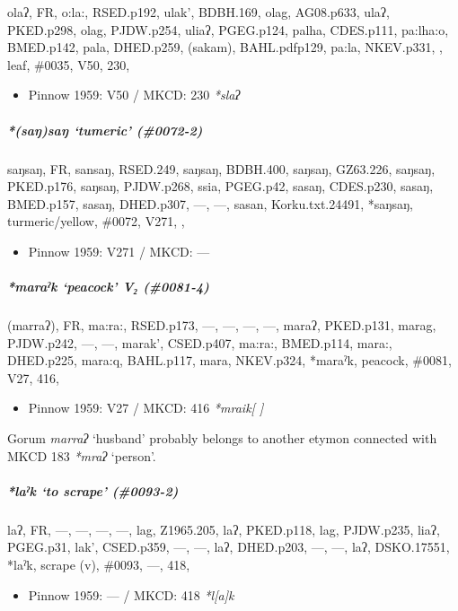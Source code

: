 \documentclass[a4paper,]{article}
\providecommand{\tightlist}{%
  \setlength{\itemsep}{0pt}\setlength{\parskip}{0pt}}
\let\oldsubparagraph\subparagraph
\renewcommand{\subparagraph}[1]{\oldsubparagraph{#1}\mbox{}}
\begin{document}
olaʔ, FR, o:la:, RSED.p192, ulak', BDBH.169, olag, AG08.p633, ulaʔ,
PKED.p298, olag, PJDW.p254, uliaʔ, PGEG.p124, palha, CDES.p111,
pa:lha:o, BMED.p142, pala, DHED.p259, (sakam), BAHL.pdfp129, pa:la,
NKEV.p331, , leaf, \#0035, V50, 230,

\begin{itemize}
\tightlist
\item
  Pinnow 1959: V50 / MKCD: 230 \emph{*slaʔ}
\end{itemize}

\subparagraph{\texorpdfstring{\emph{*(saŋ)saŋ} `tumeric'
(\#0072-2)}{*(saŋ)saŋ tumeric (\#0072-2)}}\label{saux14bsaux14b-tumeric-0072-2}

saŋsaŋ, FR, sansaŋ, RSED.249, saŋsaŋ, BDBH.400, saŋsaŋ, GZ63.226,
saŋsaŋ, PKED.p176, saŋsaŋ, PJDW.p268, ssia, PGEG.p42, sasaŋ, CDES.p230,
sasaŋ, BMED.p157, sasaŋ, DHED.p307, ---, ---, sasan, Korku.txt.24491,
*saŋsaŋ, turmeric/yellow, \#0072, V271, ,

\begin{itemize}
\tightlist
\item
  Pinnow 1959: V271 / MKCD: ---
\end{itemize}

\subparagraph{\texorpdfstring{\emph{*maraˀk} `peacock' V₂
(\#0081-4)}{*maraˀk peacock V₂ (\#0081-4)}}\label{maraux2c0k-peacock-v-0081-4}

(marraʔ), FR, ma:ra:, RSED.p173, ---, ---, ---, ---, maraʔ, PKED.p131,
marag, PJDW.p242, ---, ---, marak', CSED.p407, ma:ra:, BMED.p114, mara:,
DHED.p225, mara:q, BAHL.p117, mara, NKEV.p324, *maraˀk, peacock, \#0081,
V27, 416,

\begin{itemize}
\tightlist
\item
  Pinnow 1959: V27 / MKCD: 416 \emph{*mraik{[} {]}}
\end{itemize}

Gorum \emph{marraʔ} `husband' probably belongs to another etymon
connected with MKCD 183 \emph{*mraʔ} `person'.

\subparagraph{\texorpdfstring{\emph{*laˀk} `to scrape'
(\#0093-2)}{*laˀk to scrape (\#0093-2)}}\label{laux2c0k-to-scrape-0093-2}

laʔ, FR, ---, ---, ---, ---, lag, Z1965.205, laʔ, PKED.p118, lag,
PJDW.p235, liaʔ, PGEG.p31, lak', CSED.p359, ---, ---, laʔ, DHED.p203,
---, ---, laʔ, DSKO.17551, *laˀk, scrape (v), \#0093, ---, 418,

\begin{itemize}
\tightlist
\item
  Pinnow 1959: --- / MKCD: 418 \emph{*l{[}a{]}k}
\end{itemize}
\end{document}
